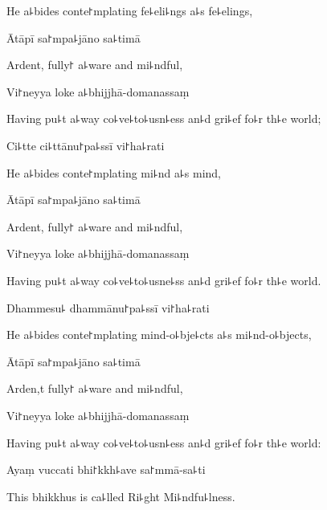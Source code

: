 \begin{english}
  He a꜕bides conte꜓mplating fe꜕eli꜕ngs a꜕s fe꜕elings,
\end{english}

Ātāpī sa꜓mpa꜕jāno sa꜕timā

\begin{english}
  Ardent, fully꜓ a꜕ware and mi꜕ndful,
\end{english}

Vi꜓neyya loke a꜕bhijjhā-domanassaṃ

\begin{english}
  Having pu꜕t a꜕way co꜕ve꜕to꜕usn꜕ess an꜕d gri꜕ef fo꜕r th꜕e world;
\end{english}

Ci꜕tte ci꜕ttānu꜓pa꜕ssī vi꜓ha꜕rati

\begin{english}
  He a꜕bides conte꜓mplating mi꜕nd a꜕s mind,
\end{english}

Ātāpī sa꜓mpa꜕jāno sa꜕timā

\begin{english}
  Ardent, fully꜓ a꜕ware and mi꜕ndful,
\end{english}

Vi꜓neyya loke a꜕bhijjhā-domanassaṃ

\begin{english}
  Having pu꜕t a꜕way co꜕ve꜕to꜕usne꜕ss an꜕d gri꜕ef fo꜕r th꜕e world.
\end{english}

Dhammesu꜕ dhammānu꜓pa꜕ssī vi꜓ha꜕rati

\begin{english}
  He a꜕bides conte꜓mplating mind-o꜕bje꜕cts a꜕s mi꜕nd-o꜕bjects,
\end{english}

Ātāpī sa꜓mpa꜕jāno sa꜕timā

\begin{english}
  Arden,t fully꜓ a꜕ware and mi꜕ndful,
\end{english}

Vi꜓neyya loke a꜕bhijjhā-domanassaṃ

\begin{english}
  Having pu꜕t a꜕way co꜕ve꜕to꜕usn꜕ess an꜕d gri꜕ef fo꜕r th꜕e world:
\end{english}

Ayaṃ vuccati bhi꜓kkh꜕ave sa꜓mmā-sa꜕ti

\begin{english}
  This bhikkhus is ca꜕lled Ri꜕ght Mi꜕ndfu꜕lness.
\end{english}

